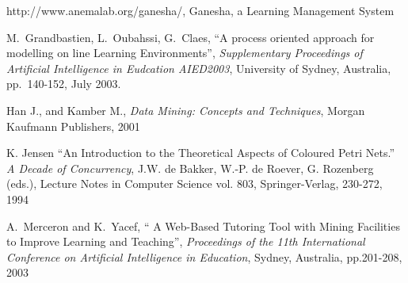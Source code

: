 \documentclass[10pt,twocolumn]{IEEEtran}
\begin{document}
\begin{thebibliography}{12}
http://www.anemalab.org/ganesha/,
Ganesha, a Learning Management System

M.~Grandbastien, L.~Oubahssi, G.~Claes, ``A process oriented approach 
for modelling on line Learning Environments'', {\em Supplementary 
Proceedings of Artificial Intelligence in Eudcation AIED2003}, 
University of Sydney, Australia, pp.~140-152, July 2003.


Han J.,  and Kamber M.,
{\it Data Mining: Concepts and Techniques},
Morgan Kaufmann Publishers, 2001


K. Jensen ``An Introduction to the Theoretical Aspects of Coloured Petri Nets.'' {\em A Decade of Concurrency}, J.W. de Bakker, W.-P. de Roever, G. Rozenberg (eds.), Lecture Notes in Computer
Science vol. 803, Springer-Verlag, 230-272, 1994








A.~Merceron  and K.~Yacef, ``
A Web-Based Tutoring Tool with Mining
Facilities to Improve Learning and Teaching'',
{\em Proceedings of the 11th International Conference
on Artificial Intelligence in Education}, Sydney, Australia, pp.201-208, 2003



\end{thebibliography}
\end{document}
